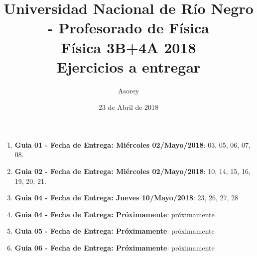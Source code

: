 \documentclass[a4paper,12pt]{article}
\begin{document}
\title{
{\normalsize{Universidad Nacional de Río Negro - Profesorado de Física}}\\
Física 3B+4A  2018 \\ Ejercicios a entregar}
\author{Asorey}
\date{23 de Abril de 2018}
\maketitle

\begin{enumerate}
	\item {\bf{Guia 01 - Fecha de Entrega: Miércoles 02/Mayo/2018}}: 03, 05, 06, 07, 08. 
	\item {\bf{Guia 02 - Fecha de Entrega: Miércoles 02/Mayo/2018}}: 10, 14, 15, 16, 19, 20, 21. 
		\item {\bf{Guia 04 - Fecha de Entrega: Jueves 10/Mayo/2018}}: 23, 26, 27, 28 
	\item {\bf{Guia 04 - Fecha de Entrega: Próximamente}}: próximamente
	\item {\bf{Guia 05 - Fecha de Entrega: Próximamente}}: próximamente
	\item {\bf{Guia 06 - Fecha de Entrega: Próximamente}}: próximamente


\end{enumerate}
\end{document}
